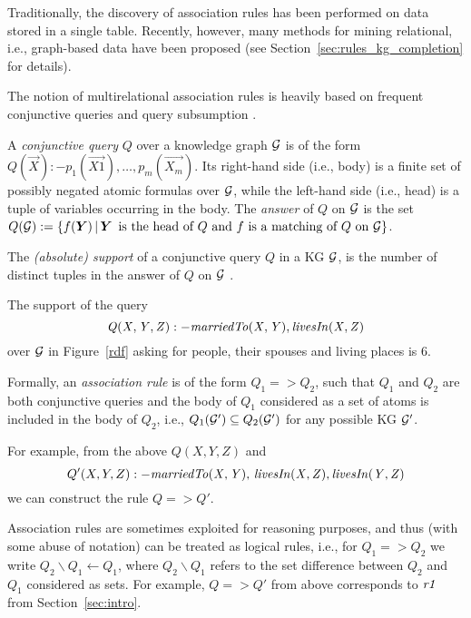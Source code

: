 Traditionally, the discovery of association rules  has been performed on data stored in a single table.
Recently, however, many methods for mining relational, i.e., graph-based data have been
proposed (see Section~\ref{sec:rules_kg_completion} for details). 

The notion of multirelational association rules is heavily based on frequent conjunctive queries and query subsumption \cite{warmer}. 

\begin{definition}
A \emph{conjunctive query} $Q$ over a knowledge graph $\mathcal{G}$ is of the form $Q(\vec{X}):-p_1(\vec{X1}),\dotsc,p_m(\vec{X_m})$. Its  right-hand side (i.e., body) is a finite set of possibly negated atomic formulas over $\mathcal{G}$, while the left-hand side (i.e., head) is a tuple of variables occurring in the body. The \emph{answer} of $Q$ on $\mathcal{G}$ is the set $Q(\cG):=\{f(\vec{Y})\,|\,\vec{Y}\,\text{  is the head of } Q \text{ and } f \text{ is a matching of } Q \text{ on } \cG\}$.
\end{definition}

The \emph{(absolute) support} of a conjunctive query $Q$ in a KG $\mathcal{G}$, is the number of distinct tuples in the answer of $Q$ on $\mathcal{G}$ \cite{DBLP:conf/ilp/DehaspeR97}. 

\begin{example}
The support of the query
\begin{equation}\mathit{Q(X,Y,Z):-marriedTo(X,Y),\, }\mathit{livesIn(X,Z)}
\end{equation}
over $\mathcal{G}$ in Figure~\ref{rdf} asking for people, their spouses and living places is $6$.
\end{example} 
Formally, an \emph{association rule} is of the form $Q_1 => Q_2$, such that $Q_1$ and $Q_2$ are both conjunctive queries and the body of $Q_1$ considered as a set of atoms is included in the body of $Q_2$,  i.e., $Q_1(\mathcal{G}')\subseteq Q_2(\mathcal{G}')$ for any possible KG $\mathcal{G}'$. 

For example, from the above $Q(X,Y,Z)$ and
\begin{equation}Q'(X,Y,Z):-\mathit{marriedTo(X,Y),\,livesIn(X,Z),\,} \mathit{livesIn(Y,Z)}
\end{equation} we can construct the rule $Q => Q'$. 
 

Association rules are sometimes exploited for reasoning purposes, and thus (with some abuse of notation) can be treated as logical rules, i.e., for $Q_1=>Q_2$ we write $Q_2\backslash Q_1 \leftarrow Q_1$, where $Q_2 \backslash Q_1$ refers to the set difference between $Q_2$ and $Q_1$ considered as sets. For example, $Q=>Q'$ from above corresponds to $\mathit{r1}$ from Section~\ref{sec:intro}.

